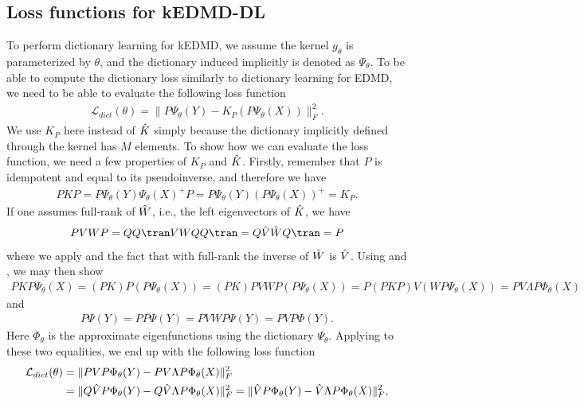 \documentclass{article}
\begin{document}
\subsection{Loss functions for kEDMD-DL}\label{sec:loss_trunc_kedmd}
To perform dictionary learning for kEDMD, we assume the kernel \(g_{\theta}\) is parameterized by \(\theta\), and the dictionary induced implicitly is denoted as \(\Psi_{\theta}\). To be able to compute the dictionary loss similarly to dictionary learning for EDMD, we need to be able to evaluate the following loss function
\begin{align}\label{eq:kedmd_dictloss}
    \mathcal{L}_{dict}(\theta) = \lVert P\Psi_{\theta}(Y) - K_P(P\Psi_{\theta}(X)) \rVert^2_F.
\end{align}
We use \(K_P\) here instead of \(\Hat K\) simply because the dictionary implicitly defined through the kernel has \(M\) elements. To show how we can evaluate the loss function, we need a few properties of \(K_P\) and \(\Hat K\). Firstly, remember that \(P\) is idempotent and equal to its pseudoinverse, and therefore we have 
\begin{align}\label{eq:pkp}
    PKP = P\Psi_{\theta}(Y)\Psi_{\theta}(X)^+P = P\Psi_{\theta}(Y)(P\Psi_{\theta}(X))^+ = K_P.
\end{align}
If one assumes full-rank of \(\Hat W\), i.e., the left eigenvectors of \(\Hat K\), we have
\begin{align}\label{eq:pvwp}
    PVWP = QQ\tran V W QQ\tran = Q \Hat V \Hat WQ\tran = P
\end{align}
where we apply  and the fact that with full-rank the inverse of \(\Hat W\) is \(\Hat V\). Using  and , we may then show 
\begin{align*}
    PKP\Psi_{\theta}(X) =  (PK) P (P\Psi_{\theta}(X)) =  (PK) PVWP  (P\Psi_{\theta}(X)) = P(PKP) V (WP\Psi_{\theta}(X)) = PV\Lambda  P\Phi_{\theta}(X)
\end{align*}
and 
\begin{align*}
    P\Psi(Y) = PP\Psi(Y) = PVWP\Psi(Y) = PVP\Phi(Y).
\end{align*}
Here \(\Phi_{\theta}\) is the approximate eigenfunctions using the dictionary \(\Psi_{\theta}\). Applying  to these two equalities, we end up with the following loss function
\begin{align*}
   \mathcal{L}_{dict}(\theta) &= \lVert PVP\Phi_{\theta}(Y) - PV\Lambda P\Phi_{\theta}(X)\rVert^2_F\\ 
   &= \lVert Q\Hat V P\Phi_{\theta}(Y) - Q\Hat V \Lambda P\Phi_{\theta}(X)\rVert_F^2 = \lVert \Hat V P\Phi_{\theta}(Y) - \Hat V \Lambda P\Phi_{\theta}(X) \rVert_F^2,
\end{align*}
\end{document}
